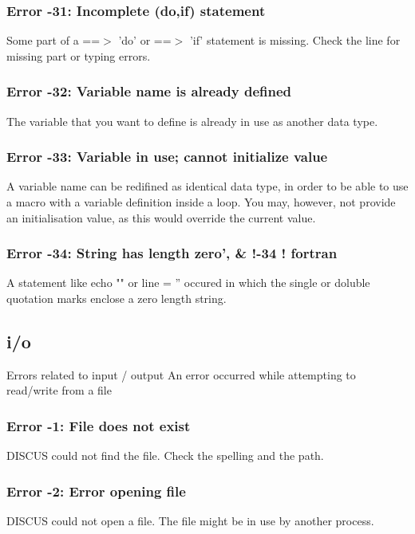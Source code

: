 \subsubsection{Error -31: Incomplete (do,if) statement}
\par
Some part of a ==$> $ 'do' or ==$> $ 'if' statement is missing. 
Check the line for missing part or typing errors. 
\subsubsection{Error -32: Variable name is already defined}
\par
The variable that you want to define is already in use as another 
data type. 
\subsubsection{Error -33: Variable in use; cannot initialize value}
\par
A variable name can be redifined as identical data type, in order 
to be able to use a macro with a variable definition inside a loop. 
You may, however, not provide an initialisation value, as this would 
override the current value. 
\subsubsection{Error -34: String has length zero',                   \& !-34  ! fortran}
\par
A statement like 
echo ""   or 
line = '' 
occured in which the single or doluble quotation marks enclose a 
zero length string. 
\subsection*{i/o}
\par
Errors related to input / output 
An error occurred while attempting to read/write from a file 
\par
\subsubsection{Error -1: File does not exist}
\par
DISCUS could not find the file. Check the spelling and the path. 
\subsubsection{Error -2: Error opening file}
\par
DISCUS could not open a file. The file might be in use by another process. 

